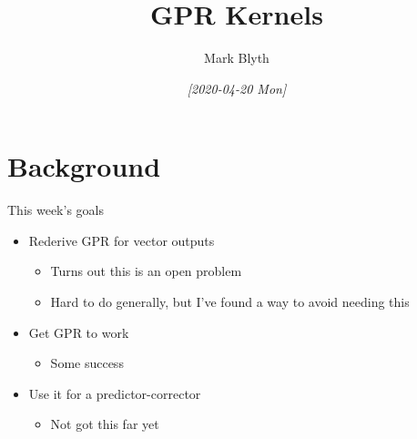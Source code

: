 \documentclass[presentation]{beamer}
\author{Mark Blyth}
\date{\textit{[2020-04-20 Mon]}}
\title{GPR Kernels}
\begin{document}
\maketitle

\section{Background}
\label{sec:org44fefbd}
\begin{frame}[label={sec:org3a90747}]{This week's goals}
\begin{itemize}
\item Rederive GPR for vector outputs
\begin{itemize}
\item Turns out this is an open problem
\item Hard to do generally, but I've found a way to avoid needing this
\end{itemize}
\item Get GPR to work
\begin{itemize}
\item Some success
\end{itemize}
\item Use it for a predictor-corrector
\begin{itemize}
\item Not got this far yet
\end{itemize}
\end{itemize}
\end{frame}
\end{document}
